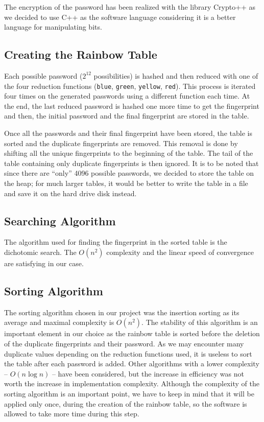 \documentclass[a4paper,11pt]{article}
\begin{document}
The encryption of the password has been realized with the library Crypto++ as we decided to use C++ as the software language considering it is a better language for manipulating bits.

\subsection{Creating the Rainbow Table}
Each possible password ($2^{12}$ possibilities) is hashed and then reduced with one of the four reduction functions (\texttt{blue}, \texttt{green}, \texttt{yellow}, \texttt{red}). This process is iterated four times on the generated passwords using a different function each time. At the end, the last reduced password is hashed one more time to get the fingerprint and then, the initial password and the final fingerprint are stored in the table.

Once all the passwords and their final fingerprint have been stored, the table is sorted and the duplicate fingerprints are removed. This removal is done by shifting all the unique fingerprints to the beginning of the table. The tail of the table containing only duplicate fingerprints is then ignored. It is to be noted that since there are ``only'' 4096 possible passwords, we decided to store the table on the heap; for much larger tables, it would be better to write the table in a file and save it on the hard drive disk instead.

\subsection{Searching Algorithm}
The algorithm used for finding the fingerprint in the sorted table is the dichotomic search. The $O(n^2)$ complexity and the linear speed of convergence are satisfying in our case.

\subsection{Sorting Algorithm}
The sorting algorithm chosen in our project was the insertion sorting as its average and maximal complexity is $O(n^2)$. 
The stability of this algorithm is an important element in our choice as the rainbow table is sorted before the deletion of 
the duplicate fingerprints and their password. As we may encounter many duplicate values depending on the reduction functions used,
it is useless to sort the table after each password is added. Other algorithms with a lower complexity -- $O(n\log n)$ -- have been considered, but the increase in efficiency was not worth the increase in implementation complexity.
Although the complexity of the sorting algorithm is an important point, we have to keep in mind that it will be applied only once, during the creation of the rainbow table, so the software is allowed to take more time during this step.
\end{document}
